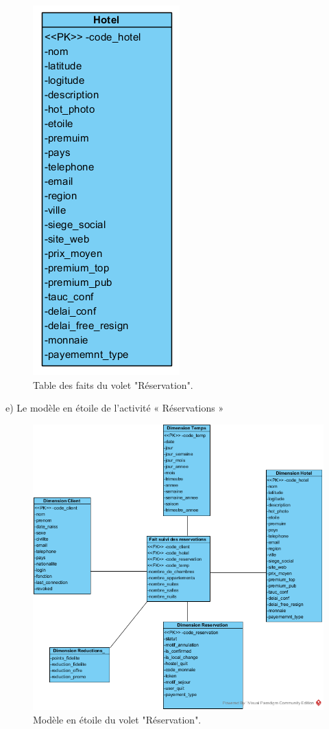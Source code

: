 \begin{figure}[!htbp]
	\begin{center}
		\includegraphics[scale=0.65]{images/dim_hotel.png}
		\caption{Table des faits du volet "Réservation".}
		\label{use_bi_tools}
	\end{center}
	\end{figure}

e) Le modèle en étoile de l’activité « Réservations »

\begin{figure}[!htbp]
	\begin{center}
		\includegraphics[scale=0.65]{images/star_reservations.png}
		\caption{Modèle en étoile du volet "Réservation".}
		\label{use_bi_tools}
	\end{center}
	\end{figure}

